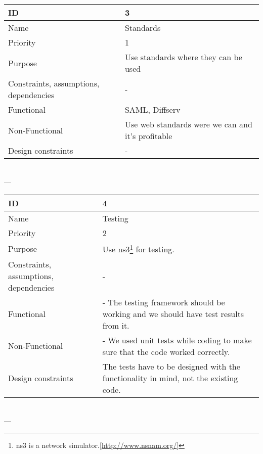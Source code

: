 \begin{center}
    \begin{tabular}{| p{4cm} | p{8cm} |}
        \hline
        ID & 3 \\
        \hline
        Name & Standards \\
        \hline
        Priority & 1 \\
        \hline
        Purpose & Use standards where they can be used \\
        \hline 
        Constraints, assumptions, dependencies & -\\
        \hline  
        Functional & SAML, Diffserv \\
        \hline
        Non-Functional & Use web standards were we can and it's profitable \\ 
        \hline
        Design constraints & - \\
        \hline
    \end{tabular}
    \\  ---  \\
    
    \begin{tabular}{| p{4cm} | p{8cm} |}
        \hline
        ID & 4 \\
        \hline
        Name & Testing  \\
        \hline
        Priority & 2 \\
        \hline
        Purpose & Use \gls{ns3}\footnote{\gls{ns3} is a network simulator.[\url{http://www.nsnam.org/}]} for testing. \\
        \hline 
        Constraints, assumptions, dependencies & -\\
        \hline  
        Functional & - The testing framework should be working and we should have test results from it.\\
        \hline
        Non-Functional & - We used unit tests while coding to make sure that the code worked correctly. \\ 
        \hline
        Design constraints & The tests have to be designed with the functionality in mind, not the existing code. \\
        \hline
    \end{tabular}
    \\  ---  \\
    

\end{center}
